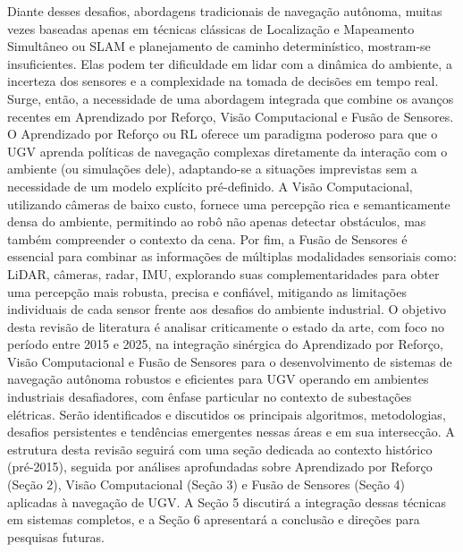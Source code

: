 Diante desses desafios, abordagens tradicionais de navegação autônoma, muitas vezes baseadas apenas em técnicas clássicas de Localização e Mapeamento Simultâneo ou \ac{SLAM} e planejamento de caminho determinístico, mostram-se insuficientes. Elas podem ter dificuldade em lidar com a dinâmica do ambiente, a incerteza dos sensores e a complexidade na tomada de decisões em tempo real. Surge, então, a necessidade de uma abordagem integrada que combine os avanços recentes em Aprendizado por Reforço, Visão Computacional e Fusão de Sensores. O Aprendizado por Reforço ou \ac{RL} oferece um paradigma poderoso para que o \ac{UGV} aprenda políticas de navegação complexas diretamente da interação com o ambiente (ou simulações dele), adaptando-se a situações imprevistas sem a necessidade de um modelo explícito pré-definido. A Visão Computacional, utilizando câmeras de baixo custo, fornece uma percepção rica e semanticamente densa do ambiente, permitindo ao robô não apenas detectar obstáculos, mas também compreender o contexto da cena. Por fim, a Fusão de Sensores é essencial para combinar as informações de múltiplas modalidades sensoriais como: \ac{LiDAR}, câmeras, radar, \ac{IMU}, explorando suas complementaridades para obter uma percepção mais robusta, precisa e confiável, mitigando as limitações individuais de cada sensor frente aos desafios do ambiente industrial.
O objetivo desta revisão de literatura é analisar criticamente o estado da arte, com foco no período entre 2015 e 2025, na integração sinérgica do Aprendizado por Reforço, Visão Computacional e Fusão de Sensores para o desenvolvimento de sistemas de navegação autônoma robustos e eficientes para \ac{UGV} operando em ambientes industriais desafiadores, com ênfase particular no contexto de subestações elétricas. Serão identificados e discutidos os principais algoritmos, metodologias, desafios persistentes e tendências emergentes nessas áreas e em sua intersecção. A estrutura desta revisão seguirá com uma seção dedicada ao contexto histórico (pré-2015), seguida por análises aprofundadas sobre Aprendizado por Reforço (Seção 2), Visão Computacional (Seção 3) e Fusão de Sensores (Seção 4) aplicadas à navegação de \ac{UGV}. A Seção 5 discutirá a integração dessas técnicas em sistemas completos, e a Seção 6 apresentará a conclusão e direções para pesquisas futuras.

